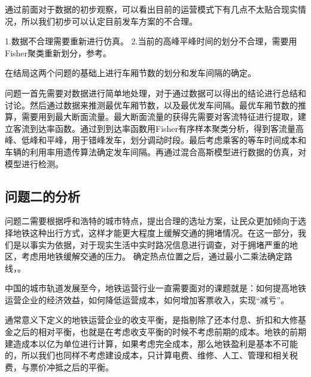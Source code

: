 \documentclass[12pt,a4paper]{mcmthesis}
\begin{document}
    通过前面对于数据的初步观察，可以看出目前的运营模式下有几点不太贴合现实情况，所以我们初步可以认定目前发车方案的不合理。

    1.数据不合理需要重新进行仿真。
    2.当前的高峰平峰时间的划分不合理，需要用Fisher聚类重新划分，参考\cite{公交发车}。

    在结局这两个问题的基础上进行车厢节数的划分和发车间隔的确定。




        {问题一首先需要对数据进行简单地处理，对于通过数据可以得出的结论进行总结和讨论。然后通过数据来推测最优车厢节数，以及最优发车间隔。最优车厢节数的推算，需要用到最大断面流量。最大断面流量的获得先需要对客流特征进行提取，建立客流到达率函数。通过到到达率函数用Fisher有序样本聚类分析，得到客流量高峰、低峰和平峰，用于错峰发车，划分调动时段。最后考虑乘客的等车时间成本和车辆的利用率用遗传算法确定发车间隔。再通过混合高斯模型进行数据的仿真，对模型进行检测。}

    \subsection{问题二的分析}
    问题二需要根据呼和浩特的城市特点，提出合理的选址方案，让民众更加倾向于选择地铁这种出行方式，这样才能更大程度上缓解交通的拥堵情况。在这一部分，我们是以事实为依据，对于现实生活中实时路况信息进行调查，对于拥堵严重的地区，考虑用地铁缓解交通的压力。
    确定热点位置之后，通过最小二乘法确定路线，。

    中国的城市轨道发展至今，地铁运营行业一直需要面对的课题就是：如何提高地铁运营企业的经济效益，如何降低运营成本，如何增加客票收入，实现“减亏”。

    通常意义下定义的地铁运营企业的收支平衡，是指剔除了还本付息、折扣和大修基金之后的相对平衡，也就是在考虑收支平衡的时候不考虑前期的成本。地铁的前期建造成本以亿为单位进行计算，如果考虑完全成本，那么地铁盈利是基本不可能的，所以我们也同样不考虑建设成本，只计算电费、维修、人工、管理和相关税费，与票价冲抵之后的平衡。
\end{document}
